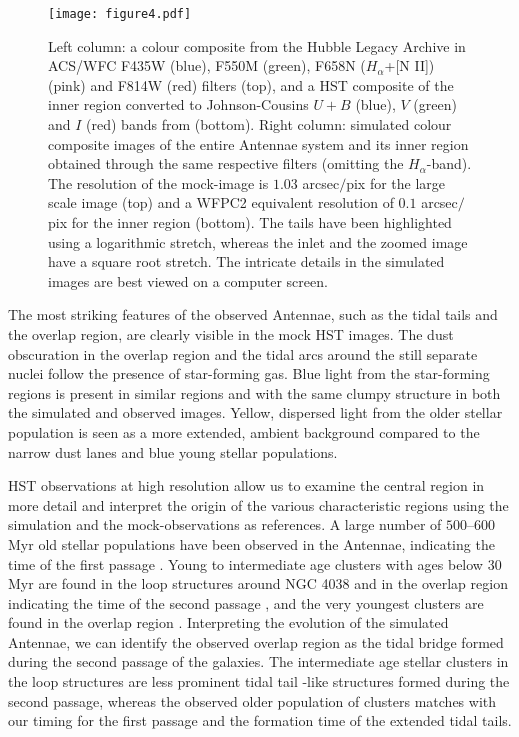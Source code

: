 \documentclass[a4paper,fleqn,usenatbib]{mnras}
\begin{document}
\begin{figure*}
\texttt{[image: figure4.pdf]}
\caption{Left column: a colour composite from the Hubble Legacy Archive in ACS/WFC F435W (blue), 
F550M (green), F658N ($H_\alpha$+[N II]) (pink) and 
F814W (red) filters (top), and a HST composite of the inner region 
converted to Johnson-Cousins $U+B$ (blue), $V$ (green) 
and $I$ (red) bands from \citet{1999AJ....118.1551W} (bottom). Right column: simulated 
colour composite images of the entire Antennae 
system and its inner region obtained through the same 
respective filters (omitting the $H_\alpha$-band). The resolution of the mock-image  
is $1.03$ arcsec$/$pix for the large scale image (top)
and a WFPC2 equivalent resolution of $0.1$ arcsec$/$pix for
the inner region (bottom). The tails have been highlighted using a logarithmic stretch, whereas the inlet and the
zoomed image have a square root stretch.
The intricate details in the simulated images are best viewed on a computer screen.}
\label{fig:mock_Antennae}
\end{figure*}


The most striking features of the observed Antennae,
such as the tidal tails and the overlap region, are clearly visible in the 
mock HST images. The dust obscuration in the overlap region and the 
tidal arcs around the still separate nuclei follow the presence of star-forming gas.  
Blue light from the star-forming regions is present
in similar regions and with the same clumpy structure in both the simulated and observed 
images. Yellow, dispersed light from the older stellar population is seen as 
a more extended, ambient background compared to the narrow dust lanes and
blue young stellar populations.

HST observations at high resolution allow us to examine 
the central region in more detail and interpret the origin of the various
characteristic regions using the simulation and the mock-observations as references.
A large number of $500$--$600$ Myr old stellar populations have been 
observed in the Antennae, indicating the time of the first passage
\citep{1999AJ....118.1551W}. 
Young to intermediate age clusters with ages below $30$ Myr are found in the loop 
structures around NGC 4038 and in the overlap region indicating the time of the second 
passage \citep{2009ApJ...701..607B}, and the very youngest clusters are found in the 
overlap region \citep{2009ApJ...699.1982B}.  Interpreting the 
evolution of the simulated Antennae, we can identify the observed 
overlap region as the tidal bridge formed during the second passage of the 
galaxies. The intermediate age stellar clusters in the loop structures are less 
prominent tidal tail -like structures formed during the second passage, whereas the observed older 
population of clusters matches with our timing for the first passage and the 
formation time of the extended tidal tails.
\end{document}
